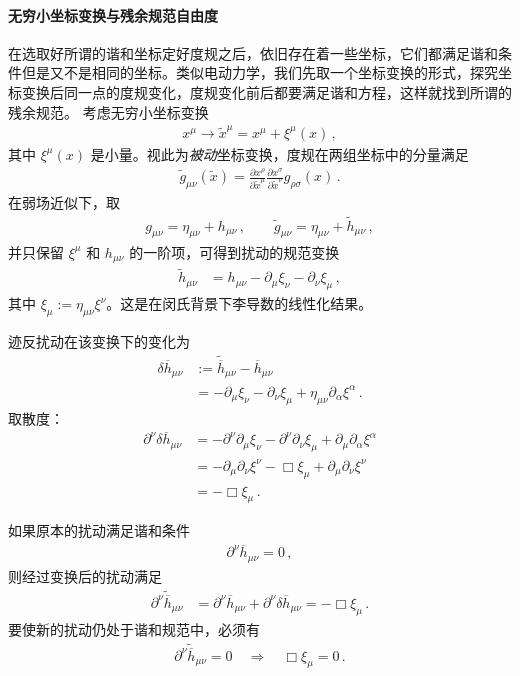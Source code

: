 \paragraph{无穷小坐标变换与残余规范自由度}
在选取好所谓的谐和坐标定好度规之后，依旧存在着一些坐标，它们都满足谐和条件但是又不是相同的坐标。类似电动力学，我们先取一个坐标变换的形式，探究坐标变换后同一点的度规变化，度规变化前后都要满足谐和方程，这样就找到所谓的残余规范。
考虑无穷小坐标变换
\begin{align}
x^{\mu}
\longrightarrow
\widetilde{x}^{\mu}
=
x^{\mu}
+
\xi^{\mu}(x)\,,
\end{align}
其中 $\xi^{\mu}(x)$ 是小量。视此为\emph{被动}坐标变换，度规在两组坐标中的分量满足
\begin{align}
\widetilde{g}_{\mu\nu}(\widetilde{x})
=
\frac{\partial x^{\rho}}{\partial \widetilde{x}^{\mu}}
\frac{\partial x^{\sigma}}{\partial \widetilde{x}^{\nu}}
g_{\rho\sigma}(x)\,.
\end{align}
在弱场近似下，取
\begin{align}
g_{\mu\nu} = \eta_{\mu\nu} + h_{\mu\nu}\,,\qquad
\widetilde{g}_{\mu\nu} = \eta_{\mu\nu} + \widetilde{h}_{\mu\nu}\,,
\end{align}
并只保留 $\xi^{\mu}$ 和 $h_{\mu\nu}$ 的一阶项，可得到扰动的规范变换
\begin{align}
\widetilde{h}_{\mu\nu}
&=
h_{\mu\nu}
-
\partial_{\mu}\xi_{\nu}
-
\partial_{\nu}\xi_{\mu}\,,
\end{align}
其中 $\xi_{\mu} := \eta_{\mu\nu}\xi^{\nu}$。这是在闵氏背景下李导数的线性化结果。

迹反扰动在该变换下的变化为
\begin{align}
\delta\overline{h}_{\mu\nu}
&:=
\widetilde{\overline{h}}_{\mu\nu}-\overline{h}_{\mu\nu}
\\[0.3em]
&=
-\partial_{\mu}\xi_{\nu}
-\partial_{\nu}\xi_{\mu}
+
\eta_{\mu\nu}\partial_{\alpha}\xi^{\alpha}\,.
\end{align}
取散度：
\begin{align}
\partial^{\nu}\delta\overline{h}_{\mu\nu}
&=
-\partial^{\nu}\partial_{\mu}\xi_{\nu}
-\partial^{\nu}\partial_{\nu}\xi_{\mu}
+
\partial_{\mu}\partial_{\alpha}\xi^{\alpha}
\\[0.3em]
&=
-\partial_{\mu}\partial_{\nu}\xi^{\nu}
-\Box\xi_{\mu}
+
\partial_{\mu}\partial_{\nu}\xi^{\nu}
\\[0.3em]
&=
-\Box\xi_{\mu}\,.
\end{align}

如果原本的扰动满足谐和条件
\begin{align}
\partial^{\nu}\overline{h}_{\mu\nu} = 0\,,
\end{align}
则经过变换后的扰动满足
\begin{align}
\partial^{\nu}\widetilde{\overline{h}}_{\mu\nu}
&=
\partial^{\nu}\overline{h}_{\mu\nu}
+
\partial^{\nu}\delta\overline{h}_{\mu\nu}
=
-\Box\xi_{\mu}\,.
\end{align}
要使新的扰动仍处于谐和规范中，必须有
\begin{align}
\partial^{\nu}\widetilde{\overline{h}}_{\mu\nu} = 0
\quad\Longrightarrow\quad
\Box\xi_{\mu} = 0\,.
\end{align}

